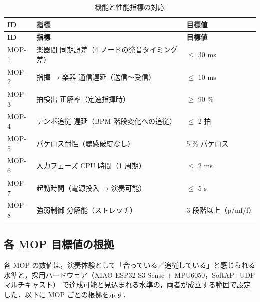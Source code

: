 \documentclass[lualatex,book,paper=a4paper,jafontsize=11.5pt,jafontscale=1.05]{jlreq}
\begin{document}
\begin{longtable}{p{} p{} p{}}
\caption{機能と性能指標の対応}\label{tab:fbs-mop}\\
\toprule
\textbf{ID} & \textbf{指標} & \textbf{目標値} \\
\midrule
\endfirsthead
\toprule
\textbf{ID} & \textbf{指標} & \textbf{目標値} \\
\midrule
\endhead
MOP-1 & 楽器間 同期誤差（4 ノードの発音タイミング差）          & $\leq$ 30 ms \\
MOP-2 & 指揮 → 楽器 通信遅延（送信〜受信）                     & $\leq$ 10 ms \\
MOP-3 & 拍検出 正解率（定速指揮時）                            & $\geq$ 90 \% \\
MOP-4 & テンポ追従 遅延（BPM 階段変化への追従）                & $\leq$ 2 拍 \\
MOP-5 & パケロス耐性（聴感破綻なし）                           & 5 \% パケロス \\
MOP-6 & 入力フェーズ CPU 時間（1 周期）                        & $\leq$ 2 ms \\
MOP-7 & 起動時間（電源投入 → 演奏可能）                        & $\leq$ 5 s \\
MOP-8 & 強弱制御 分解能（ストレッチ）                          & 3 段階以上（p/mf/f） \\
\bottomrule
\end{longtable}

\subsection{各 MOP 目標値の根拠}\label{subsec:mop-rationale}

各 MOP の数値は，演奏体験として「合っている／追従している」と感じられる
水準と，採用ハードウェア（XIAO ESP32-S3 Sense + MPU6050，SoftAP+UDP マルチキャスト）
で達成可能と見込まれる水準の，両者が成立する範囲で設定した．以下に MOP ごとの根拠を示す．
\end{document}
